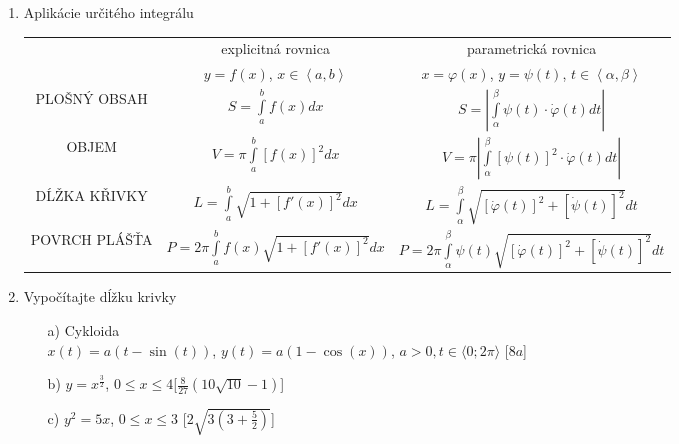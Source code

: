 \begin{enumerate}
\item Aplikácie určitého integrálu
\begin{center}
\begin{tabular}{|c|c|c|}
    \hline
     & explicitná rovnica &  parametrická rovnica\\
     & $y = f\left(x\right)$, $x\in\left\langle a,b\right\rangle$ & $x=\varphi\left(x\right)$, $y=\psi\left(t\right)$, $t\in\left\langle \alpha,\beta\right\rangle$\\
    \hline 
    PLOŠNÝ OBSAH & $S = \int\limits_{a}^{b}f\left(x\right)dx$ &  $S = \left|\int\limits_{\alpha}^{\beta} \psi\left(t\right)\cdot\dot{\varphi}\left(t\right)dt\right| $\\ \hline
    OBJEM        &$V = \pi\int\limits_{a}^{b}\left[f\left(x\right)\right]^2dx$ & $V = \pi\left|\int\limits_{\alpha}^{\beta} \left[\psi\left(t\right)\right]^2\cdot\dot{\varphi}\left(t\right)dt\right| $ \\\hline
    
    DĹŽKA KŘIVKY & $L = \int\limits_{a}^{b}\sqrt{1+\left[f'\left(x\right)\right]^2}dx$& $L = \int\limits_{\alpha}^{\beta}\sqrt{\left[\dot{\varphi}\left(t\right)\right]^2+\left[\dot{\psi}\left(t\right)\right]^2}dt$\\\hline
    
    POVRCH PLÁŠŤA& $P = 2\pi\int\limits_{a}^{b}f\left(x\right)\sqrt{1+\left[f'\left(x\right)\right]^2}dx $ & $P = 2\pi\int\limits_{\alpha}^{\beta}\psi\left(t\right)\sqrt{\left[\dot{\varphi}\left(t\right)\right]^2+\left[\dot{\psi}\left(t\right)\right]^2}dt$\\ \hline
    \end{tabular}
\end{center}





\item Vypočítajte dĺžku krivky

\begin{enumerate}
\item[a)]Cykloida\\
{$x(t) = a (t - \sin (t))$, $y(t) = a (1 - \cos(x))$}, $a>0, t \in \langle 0;2\pi \rangle$
\hspace{\fill}[$8a$]
\item[b)]{$y=x^{\frac{3}{2}}$, $0 \leq x \leq 4$}\hspace{\fill}[$\frac{8}{27}(10\sqrt{10}-1)$]
\item[c)]{$y^2=5x$, $0 \leq x \leq 3$}
\hspace{\fill}[$2\sqrt{3(3+\frac{5}{2})}$]
\end{enumerate}


\end{enumerate}
